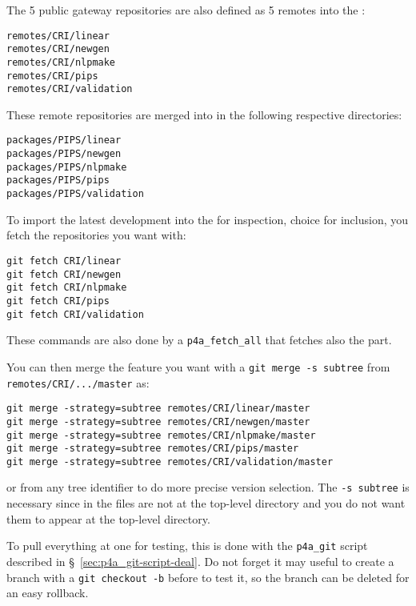 \documentclass[a4paper]{article}
\begin{document}
The 5 public gateway \Agit repositories are also defined as 5 remotes into
the \Apfa{} \Agit:
\begin{description}
\item[\texttt{remotes/CRI/linear}]
\item[\texttt{remotes/CRI/newgen}]
\item[\texttt{remotes/CRI/nlpmake}]
\item[\texttt{remotes/CRI/pips}]
\item[\texttt{remotes/CRI/validation}]
\end{description}

These remote repositories are merged into \Apfa in the following
respective directories:
\begin{description}
\item[\texttt{packages/PIPS/linear}]
\item[\texttt{packages/PIPS/newgen}]
\item[\texttt{packages/PIPS/nlpmake}]
\item[\texttt{packages/PIPS/pips}]
\item[\texttt{packages/PIPS/validation}]
\end{description}

To import the latest \Apips development into the \Apfa{} \Agit for
inspection, choice for inclusion, you fetch the repositories you want
with:
\begin{verbatim}
git fetch CRI/linear
git fetch CRI/newgen
git fetch CRI/nlpmake
git fetch CRI/pips
git fetch CRI/validation
\end{verbatim}
These commands are also done by a \verb|p4a_fetch_all| that fetches also the
\Apolylib part.

You can then merge the feature you want with a \texttt{git merge -s
  subtree} from \texttt{remotes/CRI/.../master} as:
\begin{verbatim}
git merge -strategy=subtree remotes/CRI/linear/master
git merge -strategy=subtree remotes/CRI/newgen/master
git merge -strategy=subtree remotes/CRI/nlpmake/master
git merge -strategy=subtree remotes/CRI/pips/master
git merge -strategy=subtree remotes/CRI/validation/master
\end{verbatim}
or from any tree identifier to do more precise version selection. The
\texttt{-s subtree} is necessary since in \Apfa the \Apips files are not
at the top-level directory and you do not want them to appear at the
top-level directory.

To pull everything at one for testing, this is done with the
\verb|p4a_git| script described in \S~\ref{sec:p4a_git-script-deal}. Do
not forget it may useful to create a branch with a \texttt{git checkout
  -b} before to test it, so the branch can be deleted for an easy
rollback.
\end{document}
